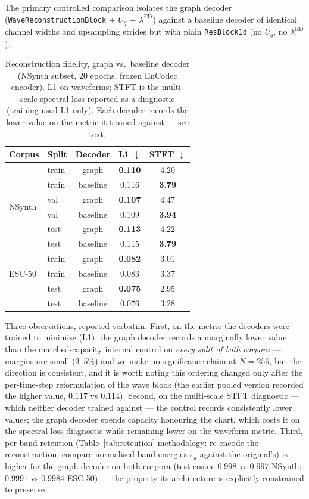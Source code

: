 \documentclass[12pt,a4paper]{article}
\begin{document}
The primary controlled comparison isolates the graph decoder
(\texttt{WaveReconstructionBlock} + $U_q$ + $\lambda^{\mathrm{ED}}$) against
a baseline decoder of identical channel widths and upsampling strides but
with plain \texttt{ResBlock1d} (no $U_q$, no $\lambda^{\mathrm{ED}}$).

\begin{table}[h]
\centering
\caption{Reconstruction fidelity, graph vs.\ baseline decoder (NSynth
subset, 20 epochs, frozen EnCodec encoder). L1 on waveforms; STFT is the
multi-scale spectral loss reported as a diagnostic (training used L1
only). Each decoder records the lower value on the metric it trained
against — see text.}
\begin{tabular}{llccc}
\toprule
Corpus & Split & Decoder & L1 $\downarrow$ & STFT $\downarrow$ \\
\midrule
\multirow{6}{*}{NSynth}
& train & graph & \textbf{0.110} & 4.20 \\
& train & baseline & 0.116 & \textbf{3.79} \\
& val & graph & \textbf{0.107} & 4.47 \\
& val & baseline & 0.109 & \textbf{3.94} \\
& test & graph & \textbf{0.113} & 4.22 \\
& test & baseline & 0.115 & \textbf{3.79} \\
\midrule
\multirow{3}{*}{ESC-50}
& train & graph & \textbf{0.082} & 3.01 \\
& train & baseline & 0.083 & 3.37 \\
& test & graph & \textbf{0.075} & 2.95 \\
& test & baseline & 0.076 & 3.28 \\
\bottomrule
\end{tabular}
\label{tab:reconstruction}
\end{table}

Three observations, reported verbatim. First, on the metric the decoders
were trained to minimise (L1), the graph decoder records a marginally
lower value than the matched-capacity internal control on
\emph{every split of both corpora} — margins are small ($3$–$5\%$) and
we make no significance claim at $N{=}256$, but the direction is
consistent, and it is worth noting this ordering changed only after the
per-time-step reformulation of the wave block (the earlier pooled
version recorded the higher value, $0.117$ vs $0.114$). Second, on the
multi-scale STFT diagnostic — which neither decoder trained against —
the control records consistently lower values; the graph decoder spends
capacity honouring the chart, which costs it on the spectral-loss
diagnostic while remaining lower on the waveform metric. Third,
per-band retention (Table~\ref{tab:retention} methodology: re-encode
the reconstruction, compare normalised band energies
$\tilde{e}_k$ against the original's) is higher for the graph decoder
on both corpora (test cosine $0.998$ vs $0.997$ NSynth; $0.9991$ vs
$0.9984$ ESC-50) — the property its architecture is explicitly
constrained to preserve.
\end{document}
